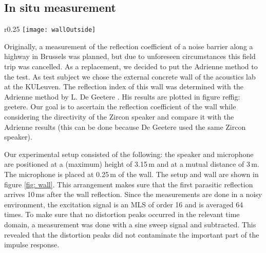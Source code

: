 \subsection{In situ measurement}\label{insitu}
\begin{wrapfigure}{r}{0.25\textwidth}
	\vspace{-10pt}
  \centering
    \texttt{[image: wallOutside]}
  \caption{Picture of the wall and setup.}
  \label{fig: wall}
\end{wrapfigure}
Originally, a measurement of the reflection coefficient of a noise barrier along a highway in Brussels was planned, but due to unforeseen circumstances this field trip was cancelled. As a replacement, we decided to put the Adrienne method to the test. As test subject we chose the external concrete wall of the acoustics lab at the KULeuven. The reflection index of this wall was determined with the Adrienne method by L. De Geetere \cite[p.68]{Geetere}. His results are plotted in figure ref{fig: geetere}. Our goal is to ascertain the reflection coefficient of the wall while considering the directivity of the Zircon speaker and compare it with the Adrienne results (this can be done because De Geetere used the same Zircon speaker). 

Our experimental setup consisted of the following: the speaker and microphone are positioned at a (maximum) height of 3.15\,m and at a mutual distance of 3\,m. The microphone is placed at 0.25\,m of the wall. The setup and wall are shown in figure \ref{fig: wall}. This arrangement makes sure that the first parasitic reflection arrives 10\,ms after the wall reflection. Since the measurements are done in a noisy environment, the excitation signal is an MLS of order 16 and is averaged 64 times. To make sure that no distortion peaks occurred in the relevant time domain, a measurement was done with a sine sweep signal and subtracted. This revealed that the distortion peaks did not contaminate the important part of the impulse response. 

